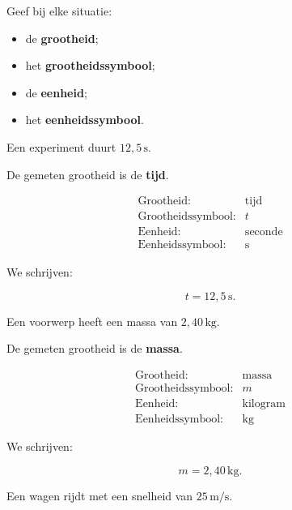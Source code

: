 \documentclass{ximera}
\begin{document}
\begin{oefening}{\oefB\ESS}

Geef bij elke situatie:

\begin{itemize}
    \item de \textbf{grootheid};
    \item het \textbf{grootheidssymbool};
    \item de \textbf{eenheid};
    \item het \textbf{eenheidssymbool}.
\end{itemize}

\begin{question}
Een experiment duurt $12{,}5\,\mathrm{s}$.

\begin{oplossing}
De gemeten grootheid is de \textbf{tijd}.

\[
\begin{array}{ll}
\text{Grootheid:} & \text{tijd} \\
\text{Grootheidssymbool:} & t \\
\text{Eenheid:} & \text{seconde} \\
\text{Eenheidssymbool:} & \mathrm{s}
\end{array}
\]

We schrijven:

\[
t = 12{,}5\,\mathrm{s}.
\]
\end{oplossing}
\end{question}


\begin{question}
Een voorwerp heeft een massa van $2{,}40\,\mathrm{kg}$.

\begin{oplossing}
De gemeten grootheid is de \textbf{massa}.

\[
\begin{array}{ll}
\text{Grootheid:} & \text{massa} \\
\text{Grootheidssymbool:} & m \\
\text{Eenheid:} & \text{kilogram} \\
\text{Eenheidssymbool:} & \mathrm{kg}
\end{array}
\]

We schrijven:

\[
m = 2{,}40\,\mathrm{kg}.
\]
\end{oplossing}
\end{question}


\begin{question}
Een wagen rijdt met een snelheid van $25\,\mathrm{m/s}$.


\end{question}
\end{oefening}
\end{document}

